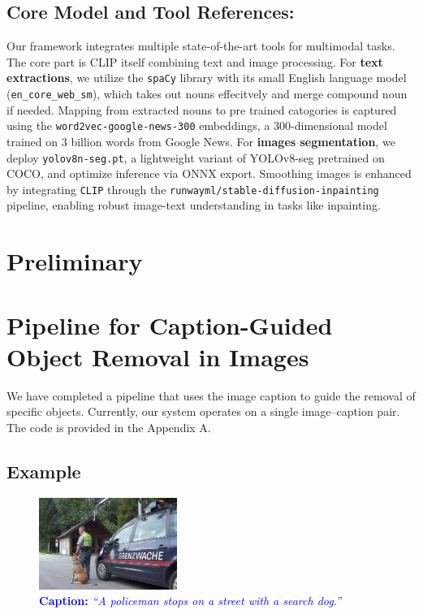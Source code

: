 \documentclass[11pt,letterpaper]{article}
\begin{document}
\subsection{Core Model and Tool References:}
Our framework integrates multiple state-of-the-art tools for multimodal tasks. The core part is CLIP itself combining text and image processing.
For \textbf{text extractions}, we utilize the \texttt{spaCy} library with its small English language model (\texttt{en\_core\_web\_sm}), which takes out nouns effecitvely and merge compound noun if needed. 
Mapping from extracted nouns to pre trained catogories is captured using the \texttt{word2vec-google-news-300} embeddings, a 300-dimensional model trained on 3 billion words from Google News. 
For \textbf{images segmentation}, we deploy \texttt{yolov8n-seg.pt}, a lightweight variant of YOLOv8-seg pretrained on COCO, and optimize inference via ONNX export. Smoothing images is enhanced by integrating \texttt{CLIP} through the \texttt{runwayml/stable-diffusion-inpainting} pipeline, enabling robust image-text understanding in tasks like inpainting.



\section{Preliminary}


\section*{Pipeline for Caption-Guided Object Removal in Images}

We have completed a pipeline that uses the image caption to guide the removal of specific objects. Currently, our system operates on a single image--caption pair. The code is provided in the Appendix A.

\subsection*{Example}
\noindent
   \begin{figure}[h]
    \centering
    \includegraphics[width=0.4\textwidth]{midterm_report/assets/oriIMG.jpg}
    \caption{\textcolor{blue}{\textbf{Caption:} \emph{``A policeman stops on a street with a search dog.''}}}
    \label{fig:original_image}
\end{figure}
\end{document}
